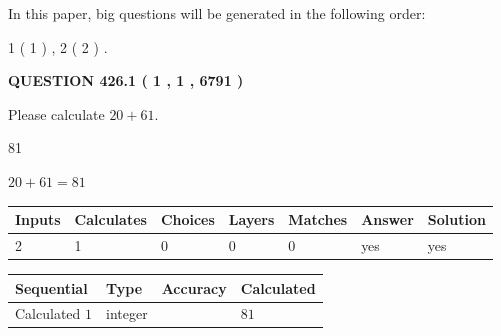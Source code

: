 \documentclass[12pt]{article}
\begin{document}
In this paper, big questions will be generated in the following order: 
   
   
   1 ( 1 )
 ,
   2 ( 2 )
 .
  
\vspace{0.2in}
  
{\textbf{\Large{QUESTION
426.1 
 ( 1 , 1 , 6791 )
}}}
  
  
 
Please calculate $ %
20 +  %
61 $.
 
 
 
\noindent{}
 
 

81
 
 
\noindent{}
 
 

 
 
 
\noindent{}
 
 

$ %
20 +  %
61=   %
81$
 
 
\noindent{}
 
 

 
   
   
   
   
\noindent\begin{tabular}{|l|l|l|l|l|l|l|}
 \hline
Inputs & Calculates & Choices & Layers & Matches & Answer & Solution \\ \hline
 2  & 
 1  & 
 0
  & 
 0  & 
 0  & 
  yes & 
  yes 
  \\ \hline
 \end{tabular}
   
   
   
   
\noindent{}
   
   
  
  
\noindent\begin{tabular}{|l|l|l|l|}
\hline
 Sequential & Type & Accuracy & Calculated \\ 
\hline
 
 
  Calculated $  1 $ & integer &  & 
  $ 81 $ 
 \\  \hline  
 \end{tabular}
   
\end{document}
